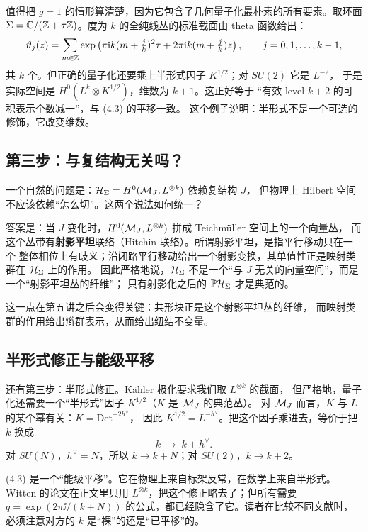 值得把 $g=1$ 的情形算清楚，因为它包含了几何量子化最朴素的所有要素。取环面
$\Sigma=\mathbb{C}/(\mathbb{Z}+\tau\mathbb{Z})$。度为 $k$ 的全纯线丛的标准截面由 theta 函数给出：
\[
\vartheta_{j}(z)=\sum_{m\in\mathbb{Z}}\exp\left(\pi\mathrm{i} k(m+\tfrac jk)^2\tau
+2\pi\mathrm{i} k(m+\tfrac jk)z\right),\qquad j=0,1,\dots,k-1,
\]
共 $k$ 个。但正确的量子化还要乘上半形式因子 $K^{1/2}$；对 $SU(2)$ 它是 $L^{-2}$，
于是实际空间是 $H^0(L^{k}\otimes K^{1/2})$，维数为 $k+1$。这正好等于
“有效 level $k+2$ 的可积表示个数减一”，与 (4.3) 的平移一致。
这个例子说明：半形式不是一个可选的修饰，它改变维数。

\subsection{第三步：与复结构无关吗？}

一个自然的问题是：$\mathcal{H}_\Sigma=H^0(\mathcal{M}_J,L^{\otimes k})$ 依赖复结构 $J$，
但物理上 Hilbert 空间不应该依赖“怎么切”。这两个说法如何统一？

答案是：当 $J$ 变化时，$H^0(\mathcal{M}_J,L^{\otimes k})$ 拼成 Teichmüller 空间上的一个向量丛，
而这个丛带有\textbf{射影平坦}联络（Hitchin 联络）。所谓射影平坦，是指平行移动只在一个
整体相位上有歧义；沿闭路平行移动给出一个射影变换，其单值性正是映射类群在 $\mathcal{H}_\Sigma$ 上的作用。
因此严格地说，$\mathcal{H}_\Sigma$ 不是一个“与 $J$ 无关的向量空间”，而是一个“射影平坦丛的纤维”；
只有射影化之后的 $\mathbb{P}\mathcal{H}_\Sigma$ 才是典范的。

这一点在第五讲之后会变得关键：共形块正是这个射影平坦丛的纤维，
而映射类群的作用给出辫群表示，从而给出纽结不变量。

\subsection{半形式修正与能级平移}

还有第三步：半形式修正。Kähler 极化要求我们取 $L^{\otimes k}$ 的截面，
但严格地，量子化还需要一个“半形式”因子 $K^{1/2}$（$K$ 是 $\mathcal{M}_J$ 的典范丛）。
对 $\mathcal{M}_J$ 而言，$K$ 与 $L$ 的某个幂有关：$K=\mathrm{Det}^{-2h^\vee}$，
因此 $K^{1/2}=L^{-h^\vee}$。把这个因子乘进去，等价于把 $k$ 换成
\begin{equation}
k\;\longrightarrow\;k+h^\vee. \tag{4.3}
\end{equation}
对 $SU(N)$，$h^\vee=N$，所以 $k\to k+N$；对 $SU(2)$，$k\to k+2$。

(4.3) 是一个“能级平移”。它在物理上来自标架反常，在数学上来自半形式。
Witten 的论文在正文里只用 $L^{\otimes k}$，把这个修正略去了；但所有需要
$q=\exp(2\pi\ii/(k+N))$ 的公式，都已经隐含了它。读者在比较不同文献时，
必须注意对方的 $k$ 是“裸”的还是“已平移”的。

